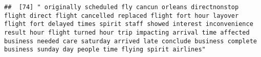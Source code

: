 \documentclass[
]{article}
\begin{document}
\begin{verbatim}
##  [74] " originally scheduled fly cancun orleans directnonstop flight direct flight cancelled replaced flight fort hour layover flight fort delayed times spirit staff showed interest inconvenience result hour flight turned hour trip impacting arrival time affected business needed care saturday arrived late conclude business complete business sunday day people time flying spirit airlines"                                                                                                                                                                                                                                                                                                                                                                                                                                                                                                                                                                                                                                                                                                                                                                                                                                                                                                                                                                                                                                                                                                                                                                                                                                                                                                                                                                                                 

\end{verbatim}
\end{document}
